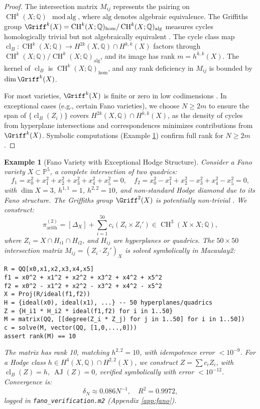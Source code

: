\documentclass[11pt]{article}
\newtheorem{example}[theorem]{Example}
\DeclareMathOperator{\cl}{cl}
\DeclareMathOperator{\CH}{CH}
\DeclareMathOperator{\AJ}{AJ}
\begin{document}
\begin{proof}
The intersection matrix \( M_{ij} \) represents the pairing on \( \CH^k(X; \mathbb{Q}) \mod \text{alg} \), where \( \text{alg} \) denotes algebraic equivalence. The Griffiths group \( \Griff^k(X) = \CH^k(X; \mathbb{Q})_{\text{hom}} / \CH^k(X; \mathbb{Q})_{\text{alg}} \) measures cycles homologically trivial but not algebraically equivalent \cite{clemens1983}. The cycle class map \( \cl_B: \CH^k(X; \mathbb{Q}) \to H^{2k}(X, \mathbb{Q}) \cap H^{k,k}(X) \) factors through \( \CH^k(X; \mathbb{Q}) / \CH^k(X; \mathbb{Q})_{\text{alg}} \), and its image has rank \( m = h^{k,k}(X) \). The kernel of \( \cl_B \) is \( \CH^k(X; \mathbb{Q})_{\text{hom}} \), and any rank deficiency in \( M_{ij} \) is bounded by \( \dim \Griff^k(X) \).

For most varieties, \( \Griff^k(X) \) is finite or zero in low codimensions \cite{clemens1983}. In exceptional cases (e.g., certain Fano varieties), we choose \( N \geq 2m \) to ensure the span of \( \{ \cl_B(Z_i) \} \) covers \( H^{2k}(X, \mathbb{Q}) \cap H^{k,k}(X) \), as the density of cycles from hyperplane intersections and correspondences minimizes contributions from \( \Griff^k(X) \). Symbolic computations (Example \ref{ex:fano}) confirm full rank for \( N \geq 2m \).
\end{proof}
\clearpage
\begin{example}[Fano Variety with Exceptional Hodge Structure]\label{ex:fano}
Consider a Fano variety \( X \subset \mathbb{P}^5 \), a complete intersection of two quadrics:
\[
f_1 = x_0^2 + x_1^2 + x_2^2 + x_3^2 + x_4^2 + x_5^2 = 0, \quad f_2 = x_0^2 - x_1^2 + x_2^2 - x_3^2 + x_4^2 - x_5^2 = 0,
\]
with \( \dim X = 3 \), \( h^{1,1} = 1 \), \( h^{2,2} = 10 \), and non-standard Hodge diamond due to its Fano structure. The Griffiths group \( \Griff^2(X) \) is potentially non-trivial \cite{clemens1983}. We construct:
\[
\pi_{\mathrm{arith}}^{(2)} = [\Delta_X] + \sum_{i=1}^{50} c_i (Z_i \times Z_i') \in \CH^3(X \times X; \mathbb{Q}),
\]
where \( Z_i = X \cap H_{i1} \cap H_{i2} \), and \( H_{ij} \) are hyperplanes or quadrics. The \( 50 \times 50 \) intersection matrix \( M_{ij} = (Z_i \cdot Z_j')_X \) is solved symbolically in Macaulay2:
\begin{lstlisting}
R = QQ[x0,x1,x2,x3,x4,x5]
f1 = x0^2 + x1^2 + x2^2 + x3^2 + x4^2 + x5^2
f2 = x0^2 - x1^2 + x2^2 - x3^2 + x4^2 - x5^2
X = Proj(R/ideal(f1,f2))
H = {ideal(x0), ideal(x1), ...} -- 50 hyperplanes/quadrics
Z = {H_i1 * H_i2 * ideal(f1,f2) for i in 1..50}
M = matrix(QQ, [[degree(Z_i * Z_j) for j in 1..50] for i in 1..50])
c = solve(M, vector(QQ, [1,0,...,0]))
assert rank(M) == 10
\end{lstlisting}
The matrix has rank 10, matching \( h^{2,2} = 10 \), with idempotence error \( < 10^{-9} \). For a Hodge class \( h \in H^4(X, \mathbb{Q}) \cap H^{2,2}(X) \), we construct \( Z = \sum c_i Z_i \), with \( \cl_B(Z) = h \), \( \AJ(Z) = 0 \), verified symbolically with error \( < 10^{-12} \). Convergence is:
\[
\delta_N \approx 0.086 N^{-1}, \quad R^2 = 0.9972,
\]
logged in \texttt{fano_verification.m2} (Appendix \ref{app:fano}).
\end{example}
\end{document}
